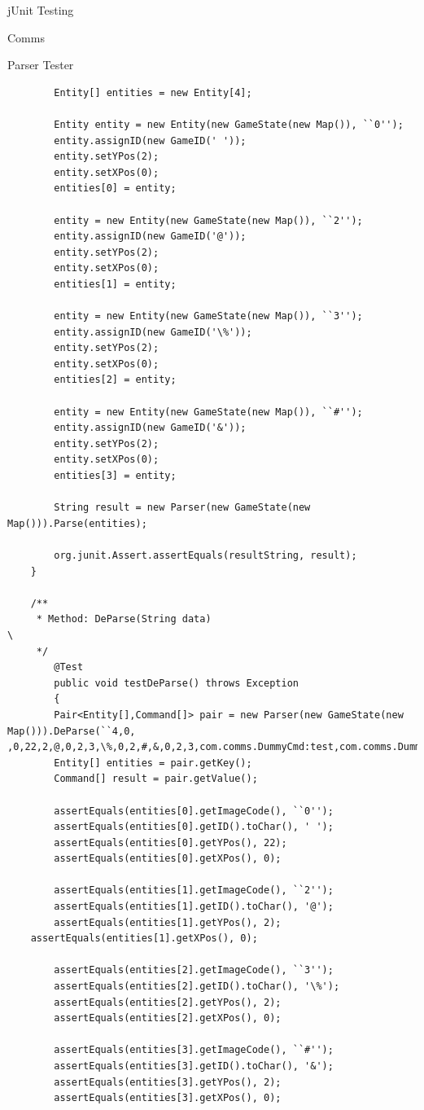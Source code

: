 \documentclass[12pt]{report}
\begin{document}
\begin{chapter}{jUnit Testing}
\begin{section}{Comms}
\begin{subsection}{Parser Tester}
\begin{lstlisting}
        Entity[] entities = new Entity[4];

        Entity entity = new Entity(new GameState(new Map()), ``0'');
        entity.assignID(new GameID(' '));
        entity.setYPos(2);
        entity.setXPos(0);
        entities[0] = entity;

        entity = new Entity(new GameState(new Map()), ``2'');
        entity.assignID(new GameID('@'));
        entity.setYPos(2);
        entity.setXPos(0);
        entities[1] = entity;

        entity = new Entity(new GameState(new Map()), ``3'');
        entity.assignID(new GameID('\%'));                                                 
        entity.setYPos(2);
        entity.setXPos(0);
        entities[2] = entity;

        entity = new Entity(new GameState(new Map()), ``#'');
        entity.assignID(new GameID('&'));
        entity.setYPos(2);
        entity.setXPos(0);
        entities[3] = entity;

        String result = new Parser(new GameState(new Map())).Parse(entities);

        org.junit.Assert.assertEquals(resultString, result);
    }
    
    /**
     * Method: DeParse(String data)                                                      \
     */
        @Test
        public void testDeParse() throws Exception
        { 
        Pair<Entity[],Command[]> pair = new Parser(new GameState(new Map())).DeParse(``4,0, ,0,22,2,@,0,2,3,\%,0,2,#,&,0,2,3,com.comms.DummyCmd:test,com.comms.DummyCmd:test,com.comms.DummyCmd:test,'');
        Entity[] entities = pair.getKey();
        Command[] result = pair.getValue();

        assertEquals(entities[0].getImageCode(), ``0'');
        assertEquals(entities[0].getID().toChar(), ' ');
        assertEquals(entities[0].getYPos(), 22);
        assertEquals(entities[0].getXPos(), 0);

        assertEquals(entities[1].getImageCode(), ``2'');
        assertEquals(entities[1].getID().toChar(), '@');
        assertEquals(entities[1].getYPos(), 2);
	assertEquals(entities[1].getXPos(), 0);

        assertEquals(entities[2].getImageCode(), ``3'');
        assertEquals(entities[2].getID().toChar(), '\%');                                  
        assertEquals(entities[2].getYPos(), 2);
        assertEquals(entities[2].getXPos(), 0);

        assertEquals(entities[3].getImageCode(), ``#'');
        assertEquals(entities[3].getID().toChar(), '&');
        assertEquals(entities[3].getYPos(), 2);
        assertEquals(entities[3].getXPos(), 0);


\end{lstlisting}
\end{subsection}
\end{section}
\end{chapter}
\end{document}
